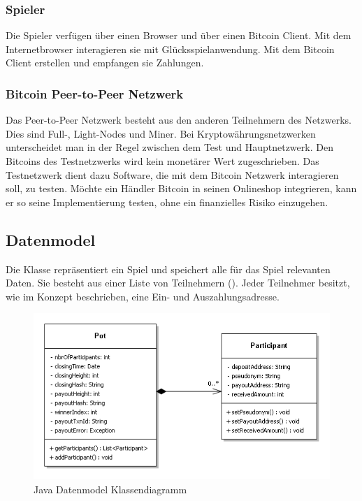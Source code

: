 \subsubsection{Spieler}
Die Spieler verfügen über einen Browser und über einen Bitcoin Client.
Mit dem Internetbrowser interagieren sie mit Glücksspielanwendung. Mit dem Bitcoin Client erstellen und empfangen sie Zahlungen.
\subsubsection{Bitcoin Peer-to-Peer Netzwerk}
Das Peer-to-Peer Netzwerk besteht aus den anderen Teilnehmern des Netzwerks. Dies sind Full-, Light-Nodes und Miner. Bei Kryptowährungsnetzwerken unterscheidet man in der Regel zwischen dem Test und Hauptnetzwerk. Den Bitcoins des Testnetzwerks wird kein monetärer Wert zugeschrieben. Das Testnetzwerk dient dazu Software, die mit dem Bitcoin Netzwerk interagieren soll, zu testen. Möchte ein Händler Bitcoin in seinen Onlineshop integrieren, kann er so seine Implementierung testen, ohne ein finanzielles Risiko einzugehen. 

\subsection{Datenmodel}
Die Klasse  repräsentiert ein Spiel und speichert alle für das Spiel relevanten Daten. Sie besteht aus einer Liste von Teilnehmern (). Jeder Teilnehmer besitzt, wie im Konzept beschrieben, eine Ein- und Auszahlungsadresse.
\begin{figure}[H]
\centering
\includegraphics[width=1\linewidth]{Figures/umsetzung_btc/btc_datenmodell}
\decoRule
\caption{Java Datenmodel Klassendiagramm}
\label{fig:btc_datenmodell}
\end{figure}

